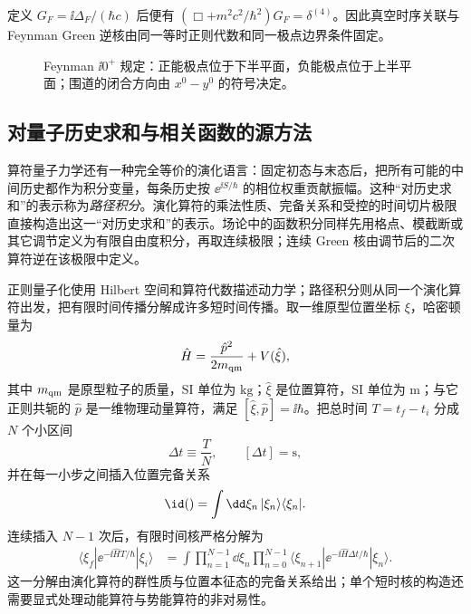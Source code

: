 定义 $G_F=\ii\Delta_F/(\hbar c)$ 后便有 $(\Box+m^2c^2/\hbar^2)G_F=\delta^{(4)}$。因此真空时序关联与 Feynman Green 逆核由同一等时正则代数和同一极点边界条件固定。

\begin{figure}[htbp]
\centering

\caption{Feynman $\ii0^+$ 规定：正能极点位于下半平面，负能极点位于上半平面；围道的闭合方向由 $x^0-y^0$ 的符号决定。}
\label{fig:feynman-poles-r2}
\end{figure}

\subsection{对量子历史求和与相关函数的源方法}

算符量子力学还有一种完全等价的演化语言：固定初态与末态后，把所有可能的中间历史都作为积分变量，每条历史按 $\ee^{\ii S/\hbar}$ 的相位权重贡献振幅。这种“对历史求和”的表示称为\emph{路径积分}。演化算符的乘法性质、完备关系和受控的时间切片极限直接构造出这一“对历史求和”的表示。场论中的函数积分同样先用格点、模截断或其它调节定义为有限自由度积分，再取连续极限；连续 Green 核由调节后的二次算符逆在该极限中定义。

正则量子化使用 Hilbert 空间和算符代数描述动力学；路径积分则从同一个演化算符出发，把有限时间传播分解成许多短时间传播。取一维原型位置坐标 $\xi$，哈密顿量为
\begin{equation*}
 \hat H=\frac{\hat p^2}{2m_{\rm qm}}+V(\hat\xi),
\end{equation*}
其中 $m_{\rm qm}$ 是原型粒子的质量，SI 单位为 $\mathrm{kg}$；$\hat\xi$ 是位置算符，SI 单位为 $\mathrm m$；与它正则共轭的 $\hat p$ 是一维物理动量算符，满足 $[\hat\xi,\hat p]=\ii\hbar$。把总时间 $T=t_f-t_i$ 分成 $N$ 个小区间
\begin{equation*}
 \Delta t\equiv\frac{T}{N},
 \qquad [\Delta t]=\mathrm s,
\end{equation*}
并在每一小步之间插入位置完备关系
\begin{equation*}
 \id()=\int\dd \xi_n\,|\xi_n\rangle\langle \xi_n|.
\end{equation*}
连续插入 $N-1$ 次后，有限时间核严格分解为
\begin{align}
 \langle \xi_f|\ee^{-\ii \hat H T/\hbar}|\xi_i\rangle
 &=\int\prod_{n=1}^{N-1}\dd \xi_n
 \prod_{n=0}^{N-1}
 \langle \xi_{n+1}|\ee^{-\ii \hat H\Delta t/\hbar}|\xi_n\rangle.
 \label{eq:path-slicing-r15}
\end{align}
这一分解由演化算符的群性质与位置本征态的完备关系给出；单个短时核的构造还需要显式处理动能算符与势能算符的非对易性。

